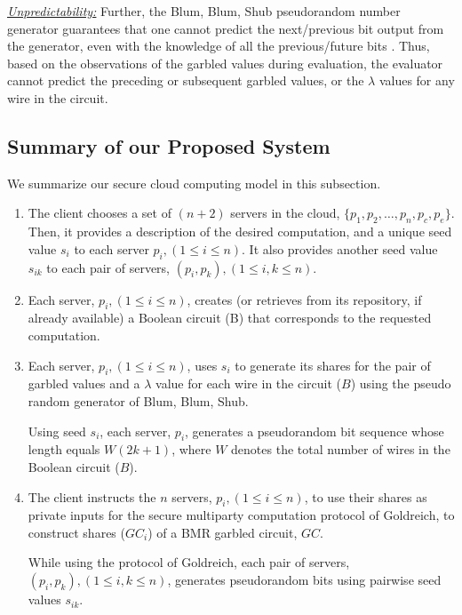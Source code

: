 \documentclass[10pt,journal,cspaper,compsoc]{IEEEtran}
\begin{document}
\underline{\em Unpredictability:} Further, the Blum, Blum, Shub pseudorandom number generator guarantees that one cannot predict the next/previous bit output from the generator, even with the knowledge of all the previous/future bits \cite{blum86,schneier95}. Thus, based on the observations of the garbled values during evaluation, the evaluator cannot predict the preceding or subsequent garbled values, or the $\lambda$ values for any wire in the circuit.


\subsection{Summary of our Proposed System}
\label{sec_our_secure_cloud_computing_model_summary}
We summarize our secure cloud computing model in this subsection.

\begin{enumerate}
    \item{The client chooses a set of $(n+2)$ servers in the cloud, $\{p_1,p_2,\ldots , p_n,p_c,p_e\}$. Then, it provides a description of the desired computation, and a unique seed value $s_i$ to each server $p_i, (1\le i\le n)$. It also provides another seed value $s_{ik}$ to each pair of servers, $(p_i,p_k), (1\le i,k\le n)$.}

    \item{Each server, $p_i, (1\le i\le n)$, creates (or retrieves from its repository, if already available) a Boolean circuit (B) that corresponds to the requested computation.}

    \item{Each server, $p_i, (1\le i\le n)$, uses $s_i$ to generate its shares for the pair of garbled values and a $\lambda$ value for each wire in the circuit ($B$) using the pseudo random generator of Blum, Blum, Shub.

        Using seed $s_i$, each server, $p_i$, generates a pseudorandom bit sequence whose length equals $W(2k+1)$, where $W$ denotes the total number of wires in the Boolean circuit ($B$).}

    \item{The client instructs the $n$ servers, $p_i, (1\le i\le n)$, to use their shares as private inputs for the secure multiparty computation protocol of Goldreich, to construct shares ($GC_i$) of a BMR garbled circuit, $GC$.

        While using the protocol of Goldreich, each pair of servers, $(p_i,p_k), (1\le i,k\le n)$, generates pseudorandom bits using pairwise seed values $s_{ik}$.

}
\end{enumerate}
\end{document}
